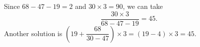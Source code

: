 Since $68-47-19=2$ and $30\times3=90$, we can take
\[\boxed{\dfrac{30\times3}{68-47-19}=45}.\]
Another solution is $\left(19+\dfrac{68}{30-47}\right)\times3=(19-4)\times3=45$.
